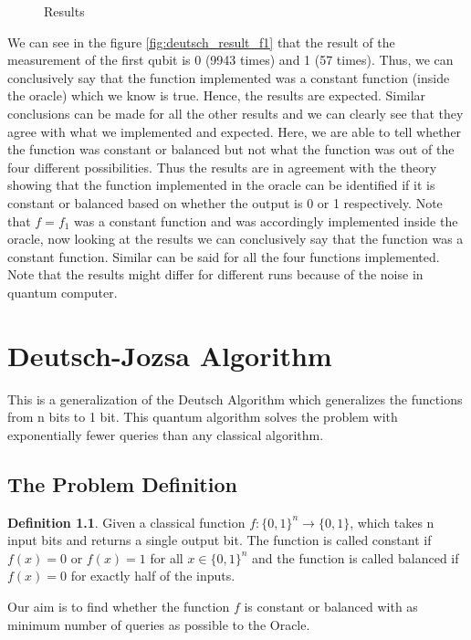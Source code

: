 \documentclass[12pt, oneside]{book}
\theoremstyle{definition}
\newtheorem{definition}{Definition}[section]
\theoremstyle{definition}
\theoremstyle{remark}
\begin{document}
\begin{enumerate}
\begin{figure}[H]
        \caption{Results}
        \label{fig:deutsch_results}
    \end{figure}
    We can see in the figure \ref{fig:deutsch_result_f1} that the result of the measurement of the first qubit is 0 (9943 times) and 1 (57 times). Thus, we can conclusively say that the function implemented was a constant function (inside the oracle) which we know is true. Hence, the results are expected. Similar conclusions can be made for all the other results and we can clearly see that they agree with what we implemented and expected. Here, we are able to tell whether the function was constant or balanced but not what the function was out of the four different possibilities. Thus the results are in agreement with the theory showing that the function implemented in the oracle can be identified if it is constant or balanced based on whether the output is 0 or 1 respectively. Note that $f=f_1$ was a constant function and was accordingly implemented inside the oracle, now looking at the results we can conclusively say that the function was a constant function. Similar can be said for all the four functions implemented. Note that the results might differ for different runs because of the noise in quantum computer.
\end{enumerate}

\chapter{Deutsch-Jozsa Algorithm}
This is a generalization of the Deutsch Algorithm which generalizes the functions from n bits to 1 bit. This quantum algorithm solves the problem with exponentially fewer queries than any classical algorithm.
\section{The Problem Definition}
\begin{definition}
    Given a classical function $f:\{0,1\}^n \rightarrow \{0,1\}$, which takes n input bits and returns a single output bit.
    The function is called constant if $f(x)=0$ or $f(x)=1$ for all $x \in \{0,1\}^n$ and the function is called balanced if $f(x)=0$ for exactly half of the inputs.
\end{definition}

Our aim is to find whether the function $f$ is constant or balanced with as minimum number of queries as possible to the Oracle.
\end{document}
